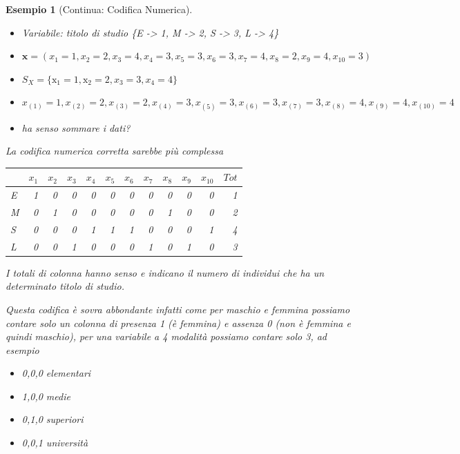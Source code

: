 \documentclass[
  11pt,
]{book}
\providecommand{\tightlist}{%
  \setlength{\itemsep}{0pt}\setlength{\parskip}{0pt}}
\theoremstyle{mytheoremstyle}
\theoremstyle{mydefstyle}
\newtheorem{example}{{Esempio}}[section]
\begin{document}
\begin{example}[Continua: Codifica Numerica]
\(\phantom{.}\)

\begin{itemize}
\tightlist
\item
  Variabile: titolo di studio \{E -\textgreater{} 1, M -\textgreater{} 2, S -\textgreater{} 3, L -\textgreater{} 4\}
\item
  \(\mathbf{x}=(x_1 = 1, x_2 = 2, x_3 = 4, x_4= 3,x_5=3,x_6=3,
  x_7=4,x_8=2,x_9=4,x_{10}=3)\)
\item
  \(S_X=\{\mathrm{x}_1 = 1,\mathrm{x}_2 = 2, x_3=3, x_4=4\}\)
\item
  \(x_{(1)}=1,x_{(2)}=2,x_{(3)}=2,x_{(4)}=3,x_{(5)}=3,x_{(6)}=3,x_{(7)}=3,x_{(8)}=4,x_{(9)}=4,
  x_{(10)}=4\)
\item
  ha senso sommare i dati?
\end{itemize}

La codifica numerica corretta sarebbe più complessa

\begin{table}[H]
\centering
\begin{tabular}{lrrrrrrrrrrr}
\toprule
  & $x_1$ & $x_2$ & $x_3$ & $x_4$ & $x_5$ & $x_6$ & $x_7$ & $x_8$ & $x_9$ & $x_{10}$ & $Tot$\\
\midrule
E & 1 & 0 & 0 & 0 & 0 & 0 & 0 & 0 & 0 & 0 & 1\\
M & 0 & 1 & 0 & 0 & 0 & 0 & 0 & 1 & 0 & 0 & 2\\
S & 0 & 0 & 0 & 1 & 1 & 1 & 0 & 0 & 0 & 1 & 4\\
L & 0 & 0 & 1 & 0 & 0 & 0 & 1 & 0 & 1 & 0 & 3\\
\bottomrule
\end{tabular}
\end{table}

I totali di colonna hanno senso e indicano il numero di individui che ha un determinato titolo
di studio.

Questa codifica è sovra abbondante infatti come per maschio e femmina possiamo contare
solo un colonna di presenza 1 (è femmina) e assenza 0 (non è femmina e quindi maschio), per una variabile a 4 modalità
possiamo contare solo 3, ad esempio

\begin{itemize}
\tightlist
\item
  0,0,0 elementari
\item
  1,0,0 medie
\item
  0,1,0 superiori
\item
  0,0,1 università
\end{itemize}


\end{example}
\end{document}
